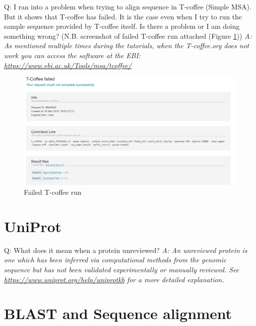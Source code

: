 \documentclass[10pt,a4paper]{article}
\begin{document}
Q: I ran into a problem when trying to align sequence in T-coffee (Simple MSA). But it shows that T-coffee has failed. It is the case even when I try to run the sample sequence provided by T-coffee itself. Is there a problem or I am doing something wrong? (N.B. screenshot of failed T-coffee run attached (Figure \ref{figure:failedTcoffee})) \newline
\textit{A: As mentioned multiple times during the tutorials, when the T-coffee.org does not work you can access the software at the EBI: \url{https://www.ebi.ac.uk/Tools/msa/tcoffee/}} \newline
\begin{figure}[!ht]
\centering \includegraphics[width=1.2\textwidth]{failed_tcoffee.png}
\caption{Failed T-coffee run}
\label{figure:failedTcoffee}
\end{figure}

\section{UniProt}
Q: What does it mean when a protein unreviewed? \newline
\textit{A: An unreviewed protein is one which has been inferred via computational methods from the genomic sequence but has not been validated experimentally or manually reviewed. See \url{https://www.uniprot.org/help/uniprotkb} for a more detailed explanation.} \newline

\section{BLAST and Sequence alignment}
\end{document}

